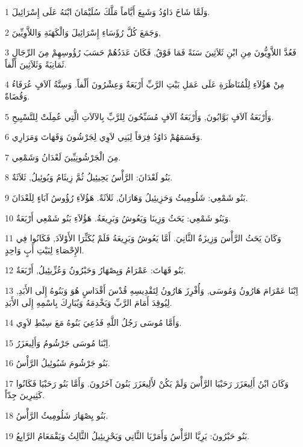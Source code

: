 \par 1 وَلَمَّا شَاخَ دَاوُدُ وَشَبِعَ أَيَّاماً مَلَّكَ سُلَيْمَانَ ابْنَهُ عَلَى إِسْرَائِيلَ.
\par 2 وَجَمَعَ كُلَّ رُؤَسَاءِ إِسْرَائِيلَ وَالْكَهَنَةِ وَاللاَّوِيِّينَ,
\par 3 فَعُدَّ اللاَّوِيُّونَ مِنِ ابْنِ ثَلاَثِينَ سَنَةً فَمَا فَوْقُ, فَكَانَ عَدَدُهُمْ حَسَبَ رُؤُوسِهِمْ مِنَ الرِّجَالِ ثَمَانِيَةً وَثَلاَثِينَ أَلْفاً.
\par 4 مِنْ هَؤُلاَءِ لِلْمُنَاظَرَةِ عَلَى عَمَلِ بَيْتِ الرَّبِّ أَرْبَعَةٌ وَعِشْرُونَ أَلْفاً. وَسِتَّةُ آلاَفٍ عُرَفَاءُ وَقُضَاةٌ.
\par 5 وَأَرْبَعَةُ آلاَفٍ بَوَّابُونَ, وَأَرْبَعَةُ آلاَفٍ مُسَبِّحُونَ لِلرَّبِّ بِالآلاَتِ الَّتِي عُمِلَتْ لِلتَّسْبِيحِ.
\par 6 وَقَسَمَهُمْ دَاوُدُ فِرَقاً لِبَنِي لاَوِي لِجَرْشُونَ وَقَهَاتَ وَمَرَارِي.
\par 7 مِنَ الْجَرْشُونِيِّينَ لَعْدَانُ وَشَمْعِي.
\par 8 بَنُو لَعْدَانَ: الرَّأْسُ يَحِيئِيلُ ثُمَّ زِيثَامُ وَيُوئِيلُ, ثَلاَثَةٌ.
\par 9 بَنُو شَمْعِي: شَلُومِيثُ وَحَزِيئِيلُ وَهَارَانُ, ثَلاَثَةٌ. هَؤُلاَءِ رُؤُوسُ آبَاءٍ لِلَعْدَانَ.
\par 10 وَبَنُو شَمْعِي: يَحَثُ وَزِينَا وَيَعُوشُ وَبَرِيعَةُ. هَؤُلاَءِ بَنُو شَمْعِي أَرْبَعَةٌ.
\par 11 وَكَانَ يَحَثُ الرَّأْسَ وَزِيزَةُ الثَّانِيَ. أَمَّا يَعُوشُ وَبَرِيعَةُ فَلَمْ يُكَثِّرَا الأَوْلاَدَ, فَكَانُوا فِي الإِحْصَاءِ لِبَيْتِ أَبٍ وَاحِدٍ.
\par 12 بَنُو قَهَاتَ: عَمْرَامُ وَيِصْهَارُ وَحَبْرُونُ وَعُزِّيئِيلُ, أَرْبَعَةٌ.
\par 13 اِبْنَا عَمْرَامَ هَارُونُ وَمُوسَى, وَأُفْرِزَ هَارُونُ لِتَقْدِيسِهِ قُدْسَ أَقْدَاسٍ هُوَ وَبَنُوهُ إِلَى الأَبَدِ, لِيُوقِدَ أَمَامَ الرَّبِّ وَيَخْدِمَهُ وَيُبَارِكَ بِاسْمِهِ إِلَى الأَبَدِ.
\par 14 وَأَمَّا مُوسَى رَجُلُ اللَّهِ فَدُعِيَ بَنُوهُ مَعَ سِبْطِ لاَوِي.
\par 15 اِبْنَا مُوسَى جَرْشُومُ وَأَلِيعَزَرُ.
\par 16 بَنُو جَرْشُومَ شَبُوئِيلُ الرَّأْسُ.
\par 17 وَكَانَ ابْنُ أَلِيعَزَرَ رَحَبْيَا الرَّأْسَ وَلَمْ يَكُنْ لأَلِيعَزَرَ بَنُونَ آخَرُونَ. وَأَمَّا بَنُو رَحَبْيَا فَكَانُوا كَثِيرِينَ جِدّاً.
\par 18 بَنُو يِصْهَارَ شَلُومِيثُ الرَّأْسُ.
\par 19 بَنُو حَبْرُونَ: يَرِيَّا الرَّأْسُ وَأَمَرْيَا الثَّانِي وَيَحْزِيئِيلُ الثَّالِثُ وَيَقْمَعَامُ الرَّابِعُ.
